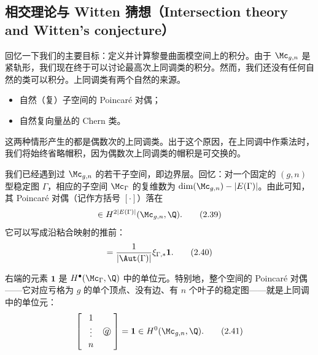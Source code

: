 \subsection{相交理论与 Witten 猜想（Intersection theory and Witten's conjecture）}

回忆一下我们的主要目标：定义并计算黎曼曲面模空间上的积分。由于 $\Mc_{g,n}$ 是紧轨形，我们现在终于可以讨论最高次上同调类的积分。然而，我们还没有任何自然的类可以积分。上同调类有两个自然的来源。
\begin{itemize}
  \item 自然（复）子空间的 Poincaré 对偶；
  \item 自然复向量丛的 Chern 类。
\end{itemize}
这两种情形产生的都是偶数次的上同调类。出于这个原因，在上同调中作乘法时，我们将始终省略帽积，因为偶数次上同调类的帽积是可交换的。

我们已经遇到过 $\Mc_{g,n}$ 的若干子空间，即边界层。回忆：对一个固定的 $(g,n)$ 型稳定图 $\Gamma$，相应的子空间 $\Mc_\Gamma$ 的复维数为 $\dim(\Mc_{g,n})-|E(\Gamma)|$。由此可知，其 Poincaré 对偶（记作方括号 $[\cdot]$）落在
\begin{equation}
  [\Gamma]\in H^{2|E(\Gamma)|}(\Mc_{g,n},\Q).
  \tag{2.39}
\end{equation}
它可以写成沿粘合映射的推前：
\begin{equation}
  [\Gamma]=\frac{1}{|\Aut(\Gamma)|}\xi_{\Gamma,*}\mathbf{1}.
  \tag{2.40}
\end{equation}


右端的元素 $\mathbf{1}$ 是 $H^{\bullet}(\Mc_\Gamma,\Q)$ 中的单位元。特别地，整个空间的 Poincaré 对偶——它对应亏格为 $g$ 的单个顶点、没有边、有 $n$ 个叶子的稳定图——就是上同调中的单位元：
\begin{equation}
  \left[\;\begin{array}{c}1\\ \vdots\\ n\end{array}\;\;\mbox{\textcircled{$g$}}\;\right]=\mathbf{1}\in H^0(\Mc_{g,n},\Q).
  \tag{2.41}
\end{equation}

